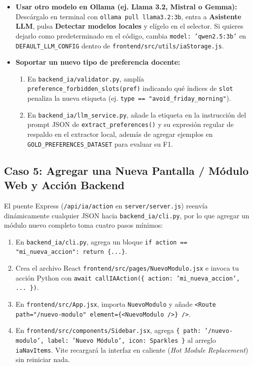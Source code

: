\documentclass[11pt,letterpaper]{article}
\newcommand{\subseccionUPV}[1]{%
    \subsection{\texorpdfstring{\textcolor{upvazul}{#1}}{#1}}%
}
\begin{document}
\begin{itemize}
    \item \textbf{Usar otro modelo en Ollama (ej. Llama 3.2, Mistral o Gemma):} Descárgalo en terminal con \texttt{ollama pull llama3.2:3b}, entra a \textbf{Asistente LLM}, pulsa \textbf{Detectar modelos locales} y elígelo en el selector. Si quieres dejarlo como predeterminado en el código, cambia \texttt{model: 'qwen2.5:3b'} en \texttt{DEFAULT\_LLM\_CONFIG} dentro de \texttt{frontend/src/utils/iaStorage.js}.
    \item \textbf{Soportar un nuevo tipo de preferencia docente:}
    \begin{enumerate}
        \item En \texttt{backend\_ia/validator.py}, amplía \texttt{preference\_forbidden\_slots(pref)} indicando qué índices de \texttt{slot} penaliza la nueva etiqueta (ej. \texttt{type == "avoid\_friday\_morning"}).
        \item En \texttt{backend\_ia/llm\_service.py}, añade la etiqueta en la instrucción del prompt JSON de \texttt{extract\_preferences()} y su expresión regular de respaldo en el extractor local, además de agregar ejemplos en \texttt{GOLD\_PREFERENCES\_DATASET} para evaluar su F1.
    \end{enumerate}
\end{itemize}

\subseccionUPV{Caso 5: Agregar una Nueva Pantalla / Módulo Web y Acción Backend}

El puente Express (\texttt{/api/ia/action} en \texttt{server/server.js}) reenvía dinámicamente cualquier JSON hacia \texttt{backend\_ia/cli.py}, por lo que agregar un módulo nuevo completo toma cuatro pasos mínimos:
\begin{enumerate}
    \item En \texttt{backend\_ia/cli.py}, agrega un bloque \texttt{if action == "mi\_nueva\_accion": return \{...\}}.
    \item Crea el archivo React \texttt{frontend/src/pages/NuevoModulo.jsx} e invoca tu acción Python con \texttt{await callIAAction(\{ action: 'mi\_nueva\_accion', ... \})}.
    \item En \texttt{frontend/src/App.jsx}, importa \texttt{NuevoModulo} y añade \texttt{<Route path="/nuevo-modulo" element=\{<NuevoModulo />\} />}.
    \item En \texttt{frontend/src/components/Sidebar.jsx}, agrega \texttt{\{ path: '/nuevo-modulo', label: 'Nuevo Módulo', icon: Sparkles \}} al arreglo \texttt{iaNavItems}. Vite recargará la interfaz en caliente (\textit{Hot Module Replacement}) sin reiniciar nada.
\end{enumerate}
\end{document}

